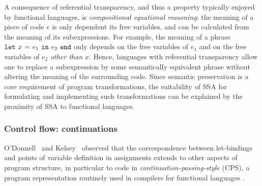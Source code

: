 A consequence of referential transparency, and thus a property
typically enjoyed by functional languages, is \emph{compositional
equational reasoning}: the meaning of a piece of code $e$ is only
dependent its free variables, and can be calculated from the meaning
of its subexpressions. For example, the meaning of a phrase $\mathtt{let}\ {x}\ \mathtt{=}\ {e_1}\ \mathtt{in}\ {e_2}\ \mathtt{end}$ only depends on the free variables of $e_1$ and on the
free variables of $e_2$ \emph{other than $x$}. Hence, languages with
referential transparency allow one to replace a subexpression by some
semantically equivalent phrase without altering the meaning of the
surrounding code. Since semantic preservation is a core requirement of
program transformations, the suitability of SSA for formulating and
implementing such transformations can be explained by the proximity of
SSA to functional languages.

\subsubsection{Control flow: continuations}
\label{section:Part1:Semantics:Continuations}
O'Donnell~\cite{ODonnellPhD} and Kelsey~\cite{Kelsey95} observed that
the correspondence between let-bindings and points of variable
definition in assignments extends to other aspects of program
structure, in particular to code in
\emph{continuation-passing-style} (CPS), a program
representation routinely used in compilers for functional languages
\cite{DBLP:journals/lisp/SussmanS98a,Appel:CWC}.


